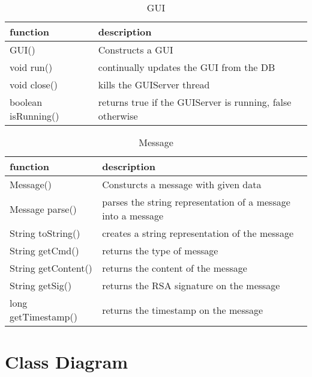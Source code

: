 \begin{table}[h]
    \centering
    \begin{tabular}{p{3.6cm}p{9cm}}
    function     & description\\ \hline
    GUI()        & Constructs a GUI\\
    void run()   & continually updates the GUI from the DB\\
    void close() & kills the GUIServer thread\\
    
    boolean isRunning() & returns true if the GUIServer is running, false otherwise\\
    \end{tabular}
    \caption{GUI}
\end{table}

\begin{table}[h]
    \centering
    \begin{tabular}{p{3.6cm}p{9cm}}
    function            & description\\ \hline
    Message()           & Consturcts a message with given data\\
    
    Message parse()     & parses the string representation of a message into a message\\
    
    String toString()   & creates a string representation of the message\\
    String getCmd()     & returns the type of message\\
    String getContent() & returns the content of the message\\
    String getSig()     & returns the RSA signature on the message\\
    long getTimestamp() & returns the timestamp on the message\\
    \end{tabular}
    \caption{Message}
\end{table}

\section{Class Diagram}
